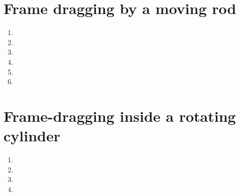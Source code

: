 \documentclass[11pt, oneside]{article}
\begin{document}
\section{Frame dragging by a moving rod}
\begin{enumerate}
\item


\item


\item


\item


\item


\item


\end{enumerate}

\section{Frame-dragging inside a rotating cylinder}
\begin{enumerate}
\item


\item


\item


\item


\end{enumerate}
\end{document}
